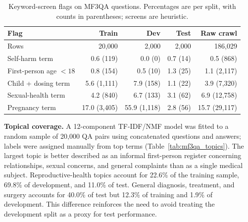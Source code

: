 \documentclass[manuscript,screen,review]{acmart}
\begin{document}
\begin{table}[ht]
\caption{Keyword-screen flags on MF3QA questions. Percentages are per split, with counts in parentheses; screens are heuristic.}\label{tab:mf3qa_sensitive}
\small
\begin{tabular}{@{}lrrrr@{}}
\toprule
Flag & Train & Dev & Test & Raw crawl \\
\midrule
Rows & 20,000 & 2,000 & 2,000 & 186,029 \\
Self-harm term & 0.6 (119) & 0.0 (0) & 0.7 (14) & 0.5 (868) \\
First-person age $<18$ & 0.8 (154) & 0.5 (10) & 1.3 (25) & 1.1 (2,117) \\
Child + dosing term & 5.6 (1,111) & 7.9 (158) & 1.1 (22) & 3.9 (7,320) \\
Sexual-health term & 4.2 (840) & 6.7 (133) & 3.1 (62) & 6.9 (12,758) \\
Pregnancy term & 17.0 (3,405) & 55.9 (1,118) & 2.8 (56) & 15.7 (29,117) \\
\bottomrule
\end{tabular}
\end{table}

\textbf{Topical coverage.} A 12-component TF-IDF/NMF model was fitted to a random sample of 20,000 QA pairs using concatenated questions and answers; labels were assigned manually from top terms (Table~\ref{tab:mf3qa_topics}). The largest topic is better described as an informal first-person register concerning relationships, sexual concerns, and general complaints than as a single medical subject. Reproductive-health topics account for 22.6\% of the training sample, 69.8\% of development, and 11.0\% of test. General diagnosis, treatment, and surgery accounts for 40.0\% of test but 12.3\% of training and 1.9\% of development. This difference reinforces the need to avoid treating the development split as a proxy for test performance.
\end{document}
